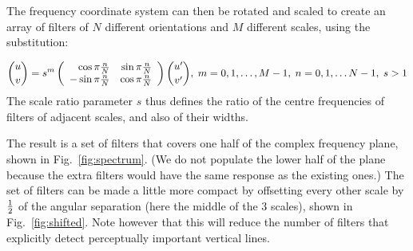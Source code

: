 \documentclass[12pt,a4]{article}
\begin{document}
The frequency coordinate system can then be rotated and scaled to create an array of filters of $N$ different orientations and $M$ different scales, using the substitution:

\[ {u \choose v} = s^m \left( \begin{array}{rr}\cos \pi{n\over N} & \sin \pi{n\over N} \\ -\sin \pi{n\over N} & \cos \pi{n\over N} \end{array}\right) {u' \choose v'} ,\; m = 0, 1, \ldots, M-1,\; n = 0, 1, \ldots N-1,\; s > 1 \]
The scale ratio parameter $s$ thus defines the ratio of the centre frequencies of filters of adjacent scales, and also of their widths. 

The result is a set of filters that covers one half of the complex frequency plane, shown in Fig.~\ref{fig:spectrum}.  (We do not populate the lower half of the plane because the extra filters would have the same response as the existing ones.)  The set of filters can be made a little more compact by offsetting every other scale by $1\over 2$ of the angular separation (here the middle of the 3 scales), shown in Fig.~\ref{fig:shifted}.  Note however that this will reduce the number of filters that explicitly detect perceptually important vertical lines.
\end{document}
